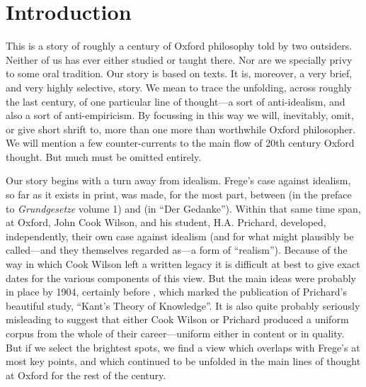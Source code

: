 \section{Introduction} %
\label{sec:introduction}

This is a story of roughly a century of Oxford philosophy told by two outsiders. Neither of us has ever either studied or taught there. Nor are we specially privy to some oral tradition. Our story is based on texts. It is, moreover, a very brief, and very highly selective, story.  We mean to trace the unfolding, across roughly the last century, of one particular line of thought---a sort of anti-idealism, and also a sort of anti-empiricism. By focussing in this way we will, inevitably, omit, or give short shrift to, more than one more than worthwhile Oxford philosopher. We will mention a few counter-currents to the main flow of 20th century Oxford thought. But much must be omitted entirely.

Our story begins with a turn away from idealism. Frege's case against idealism, so far as it exists in print, was made, for the most part, between \citeyear{Frege:1893fv} (in the preface to \emph{Grundgesetze} volume 1) and \citeyear{Frege:1918lq} (in ``Der Gedanke''). Within that same time span, at Oxford, John Cook Wilson, and his student, H.A. Prichard, developed, independently, their own case against idealism (and for what might plausibly be called---and they themselves regarded as---a form of ``realism''). Because of the way in which Cook Wilson left a written legacy it is difficult at best to give exact dates for the various components of this view. But the main ideas were probably in place by 1904, certainly before \citeyear{Prichard:1909yg}, which marked the publication of Prichard’s beautiful study, ``Kant’s Theory of Knowledge''. It is also quite probably seriously misleading to suggest that either Cook Wilson or Prichard produced a uniform corpus from the whole of their career---uniform either in content or in quality. But if we select the brightest spots, we find a view which overlaps with Frege's at most key points, and which continued to be unfolded in the main lines of thought at Oxford for the rest of the century.

